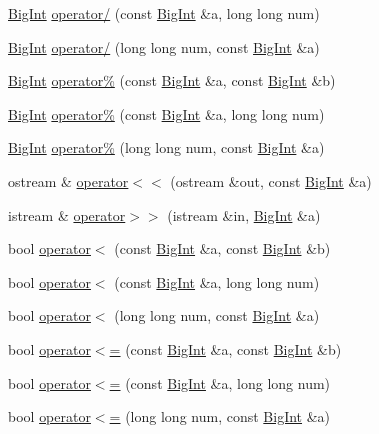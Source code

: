 \begin{DoxyCompactItemize}
\hyperlink{class_big_int}{Big\+Int} \hyperlink{class_big_int_ae879f205898eae6cf31b4f565f5a5ec1}{operator/} (const \hyperlink{class_big_int}{Big\+Int} \&a, long long num)
\item 
\hyperlink{class_big_int}{Big\+Int} \hyperlink{class_big_int_abd3776fc592b78cb26812dfebf9b0a87}{operator/} (long long num, const \hyperlink{class_big_int}{Big\+Int} \&a)
\item 
\hyperlink{class_big_int}{Big\+Int} \hyperlink{class_big_int_a463be2d085983a0ba8a0cc5be32c5f96}{operator\%} (const \hyperlink{class_big_int}{Big\+Int} \&a, const \hyperlink{class_big_int}{Big\+Int} \&b)
\item 
\hyperlink{class_big_int}{Big\+Int} \hyperlink{class_big_int_a628feeac6b244f8107518fb8ba6f379c}{operator\%} (const \hyperlink{class_big_int}{Big\+Int} \&a, long long num)
\item 
\hyperlink{class_big_int}{Big\+Int} \hyperlink{class_big_int_a071c38790554cbfc14e58e4ebd56c702}{operator\%} (long long num, const \hyperlink{class_big_int}{Big\+Int} \&a)
\item 
ostream \& \hyperlink{class_big_int_acba0569c5cb9dc9af2d27f65ce48daf8}{operator$<$$<$} (ostream \&out, const \hyperlink{class_big_int}{Big\+Int} \&a)
\item 
istream \& \hyperlink{class_big_int_abe387e8cc08c8919c29e7573a74559f2}{operator$>$$>$} (istream \&in, \hyperlink{class_big_int}{Big\+Int} \&a)
\item 
bool \hyperlink{class_big_int_af6b14de2bba24c0478b7efa932190d01}{operator$<$} (const \hyperlink{class_big_int}{Big\+Int} \&a, const \hyperlink{class_big_int}{Big\+Int} \&b)
\item 
bool \hyperlink{class_big_int_a5f4e22a269f15452a8f4a859f3f59429}{operator$<$} (const \hyperlink{class_big_int}{Big\+Int} \&a, long long num)
\item 
bool \hyperlink{class_big_int_a603f5f6ed78dfb744b36838ef8036367}{operator$<$} (long long num, const \hyperlink{class_big_int}{Big\+Int} \&a)
\item 
bool \hyperlink{class_big_int_ad57ab1ea41721d4e2f6c6450db9ebbba}{operator$<$=} (const \hyperlink{class_big_int}{Big\+Int} \&a, const \hyperlink{class_big_int}{Big\+Int} \&b)
\item 
bool \hyperlink{class_big_int_a52513cceb8fd5c4ff3920081c550e825}{operator$<$=} (const \hyperlink{class_big_int}{Big\+Int} \&a, long long num)
\item 
bool \hyperlink{class_big_int_ab26e0eb90a3cfc88a946898d98d8eb9c}{operator$<$=} (long long num, const \hyperlink{class_big_int}{Big\+Int} \&a)

\end{DoxyCompactItemize}
